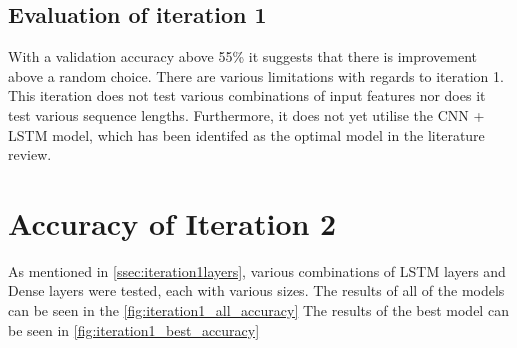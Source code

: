 \subsection{Evaluation of iteration 1}
With a validation accuracy above 55\% it suggests that there is improvement above a random choice.
There are various limitations with regards to iteration 1. This iteration does not test various combinations of input features nor does
it test various sequence lengths. Furthermore, it does not yet utilise the CNN + LSTM model, which has been identifed as the optimal model
in the literature review.

\section{Accuracy of Iteration 2}
As mentioned in \autoref{ssec:iteration1layers}, various combinations of LSTM layers and Dense layers were tested,
each with various sizes. The results of all of the models can be seen in the \autoref{fig:iteration1_all_accuracy}
The results of the best model can be seen in \autoref{fig:iteration1_best_accuracy}
